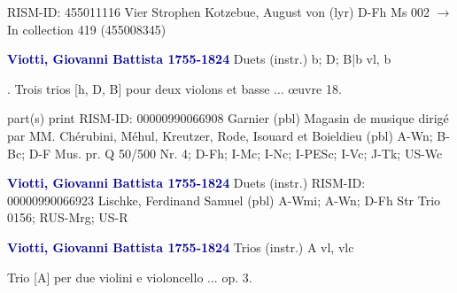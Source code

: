 \documentclass[twocolumn]{book}
\begin{document}
\newline RISM-ID: 455011116
\newline Vier Strophen
\newline Kotzebue, August von  (lyr)
\newline D-Fh  Ms 002
\newline $\rightarrow$ In collection 419 (455008345)

\newline \par \vspace{7pt} \textcolor{darkblue}{\textbf{Viotti, Giovanni Battista  1755-1824}}
\newline Duets (instr.)  b; D; B|b  
 vl, b
\newline \begin{itshape}. Trois trios [h, D, B] pour deux violons et basse ... œuvre 18.\end{itshape} 
\newline \textcolor{darkblue}{}  part(s)  
\newline print
\newline RISM-ID: 00000990066908
\newline Garnier  (pbl)
\newline Magasin de musique dirigé par MM. Chérubini, Méhul, Kreutzer, Rode, Isouard et Boieldieu  (pbl)
\newline A-Wn; B-Bc; D-F  Mus. pr. Q 50/500 Nr. 4; D-Fh; I-Mc; I-Nc; I-PESc; I-Vc; J-Tk; US-Wc
\newline \par \vspace{7pt} \textcolor{darkblue}{\textbf{Viotti, Giovanni Battista  1755-1824}}
\newline Duets (instr.)    
\newline RISM-ID: 00000990066923
\newline Lischke, Ferdinand Samuel  (pbl)
\newline A-Wmi; A-Wn; D-Fh  Str Trio 0156; RUS-Mrg; US-R
\newline \par \vspace{7pt} \textcolor{darkblue}{\textbf{Viotti, Giovanni Battista  1755-1824}}
\newline Trios (instr.)  A  
 vl, vlc
\newline \begin{itshape}Trio [A] per due violini e violoncello ... op. 3.\end{itshape} 
\end{document}
